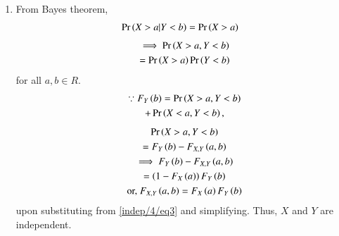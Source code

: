 \begin{enumerate}
    
    
     {\em Option 1 is incorrect}.
    
    \item From Bayes theorem,
    \begin{align}
        \Pr\left(X>a|Y<b\right)&=\Pr\left(X>a\right)
    \end{align}
    \begin{multline}
            \label{indep/4/eq3}
            \implies \Pr\left(X>a,Y<b\right) \\ =\Pr\left(X>a\right)\Pr\left(Y<b\right)
        \end{multline}
    for all $a,b\in R$. 
    \begin{multline}
    \because     F_Y\left(b\right)=\Pr\left(X>a,Y<b\right) \\ +\Pr\left(X<a,Y<b\right), 
    \end{multline}
    \begin{multline}
    \Pr\left(X>a,Y<b\right) \\= F_Y\left(b\right)-F_{X,Y}\left(a,b\right)
    \\
    \implies           F_Y\left(b\right)-F_{X,Y}\left(a,b\right) \\=\left(1-F_X\left(a\right)\right)F_Y\left(b\right)\\
    \text{or, }
        F_{X,Y}\left(a,b\right)=F_X\left(a\right)F_Y\left(b\right)
    \end{multline}
    upon substituting from  \eqref{indep/4/eq3} and simplifying.
     Thus, $X$ and $Y$ are independent. 
    

\end{enumerate}
